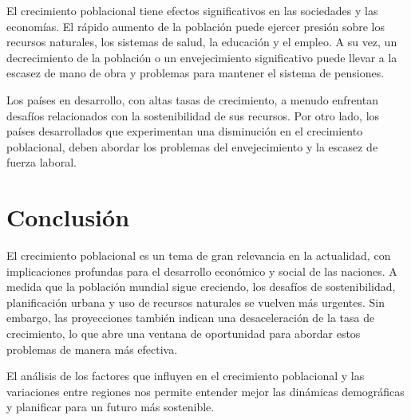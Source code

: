 El crecimiento poblacional tiene efectos significativos en las sociedades y las economías. El rápido aumento de la población puede ejercer presión sobre los recursos naturales, los sistemas de salud, la educación y el empleo. A su vez, un decrecimiento de la población o un envejecimiento significativo puede llevar a la escasez de mano de obra y problemas para mantener el sistema de pensiones.

Los países en desarrollo, con altas tasas de crecimiento, a menudo enfrentan desafíos relacionados con la sostenibilidad de sus recursos. Por otro lado, los países desarrollados que experimentan una disminución en el crecimiento poblacional, deben abordar los problemas del envejecimiento y la escasez de fuerza laboral.

\section{Conclusión}

El crecimiento poblacional es un tema de gran relevancia en la actualidad, con implicaciones profundas para el desarrollo económico y social de las naciones. A medida que la población mundial sigue creciendo, los desafíos de sostenibilidad, planificación urbana y uso de recursos naturales se vuelven más urgentes. Sin embargo, las proyecciones también indican una desaceleración de la tasa de crecimiento, lo que abre una ventana de oportunidad para abordar estos problemas de manera más efectiva.

El análisis de los factores que influyen en el crecimiento poblacional y las variaciones entre regiones nos permite entender mejor las dinámicas demográficas y planificar para un futuro más sostenible.

%
%
%

